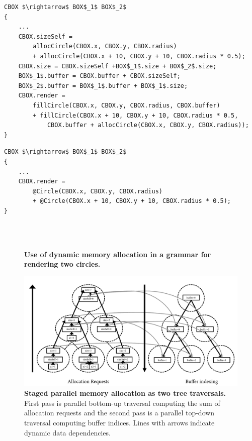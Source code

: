\newsavebox{\twocirclesExpanded}
\begin{lrbox}{\twocirclesExpanded}%
\begin{lstlisting}[mathescape]
CBOX $\rightarrow$ BOX$_1$ BOX$_2$
{
	...
	CBOX.sizeSelf = 
		allocCircle(CBOX.x, CBOX.y, CBOX.radius)
		+ allocCircle(CBOX.x + 10, CBOX.y + 10, CBOX.radius * 0.5);
	CBOX.size = CBOX.sizeSelf +BOX$_1$.size + BOX$_2$.size;
	BOX$_1$.buffer = CBOX.buffer + CBOX.sizeSelf;
	BOX$_2$.buffer = BOX$_1$.buffer + BOX$_1$.size;
	CBOX.render = 
		fillCircle(CBOX.x, CBOX.y, CBOX.radius, CBOX.buffer)
		+ fillCircle(CBOX.x + 10, CBOX.y + 10, CBOX.radius * 0.5,
			CBOX.buffer + allocCircle(CBOX.x, CBOX.y, CBOX.radius));
}
\end{lstlisting}
\end{lrbox}

\newsavebox{\twocirclesMacro}
\begin{lrbox}{\twocirclesMacro}%
\begin{lstlisting}[mathescape]
CBOX $\rightarrow$ BOX$_1$ BOX$_2$
{
	...
	CBOX.render = 
		@Circle(CBOX.x, CBOX.y, CBOX.radius)
		+ @Circle(CBOX.x + 10, CBOX.y + 10, CBOX.radius * 0.5);
}
\end{lstlisting}
\end{lrbox}




\begin{figure}
  \\
  \\
\caption{\textbf{Use of dynamic memory allocation in a grammar for rendering two circles.}}
\label{fig:stagedallocClient}
\end{figure}

\begin{figure}
\centering
\includegraphics[trim=0 0 0 0,clip,width=1.0\columnwidth]{chapter6/macro}
\caption{\textbf{Staged parallel memory allocation as two tree traversals.} First pass is parallel bottom-up traversal computing the sum of allocation requests and the second pass is a parallel top-down traversal computing buffer indices. Lines with arrows indicate dynamic data dependencies.}
\label{fig:renderingtraversal}
\end{figure}


